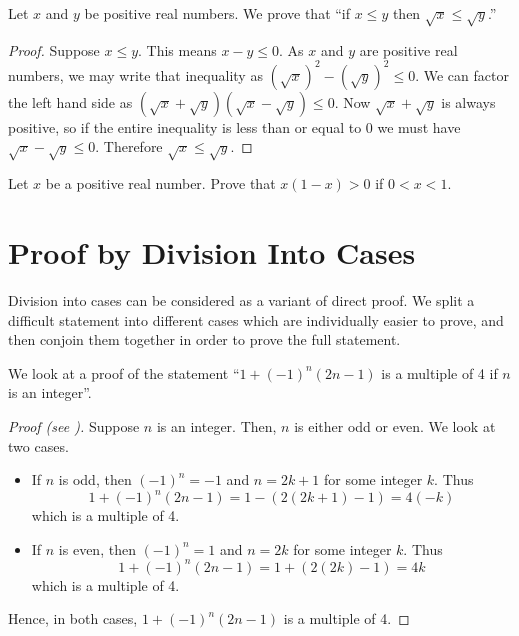 \begin{example}
    Let $x$ and $y$ be positive real numbers. We prove that ``if $x \leq y$ then $\sqrt x \leq \sqrt y$.''
    \begin{proof}
        Suppose $x \leq y$. This means $x - y \leq 0$. As $x$ and $y$ are positive real numbers, we may write that inequality as $(\sqrt x)^2 - (\sqrt y)^2 \leq 0$. We can factor the left hand side as $(\sqrt x + \sqrt y)(\sqrt x - \sqrt y) \leq 0$. Now $\sqrt x + \sqrt y$ is always positive, so if the entire inequality is less than or equal to 0 we must have $\sqrt x - \sqrt y \leq 0$. Therefore $\sqrt x \leq \sqrt y$.
    \end{proof}
\end{example}

\begin{exercise}
    Let $x$ be a positive real number. Prove that $x(1-x) > 0$ if $0 < x < 1$.
\end{exercise}

\section{Proof by Division Into Cases}
Division into cases can be considered as a variant of direct proof. We split a difficult statement into different cases which are individually easier to prove, and then conjoin them together in order to prove the full statement.

\begin{example}
    We look at a proof of the statement ``$1 + (-1)^n(2n-1)$ is a multiple of 4 if $n$ is an integer''.
    \begin{proof}[Proof (see {\cite[p.~124]{hammack_2018}})]
        Suppose $n$ is an integer. Then, $n$ is either odd or even. We look at two cases.
        \begin{itemize}
            \item If $n$ is odd, then $(-1)^n = -1$ and $n = 2k+1$ for some integer $k$. Thus
            \[
                1 + (-1)^n(2n-1) = 1 - (2(2k+1)-1) = 4(-k)
            \]
            which is a multiple of 4.
            \item If $n$ is even, then $(-1)^n = 1$ and $n = 2k$ for some integer $k$. Thus
            \[
                1 + (-1)^n(2n-1) = 1 + (2(2k)-1) = 4k
            \]
            which is a multiple of 4.
        \end{itemize}
        Hence, in both cases, $1 + (-1)^n(2n-1)$ is a multiple of 4.
    \end{proof}
\end{example}

